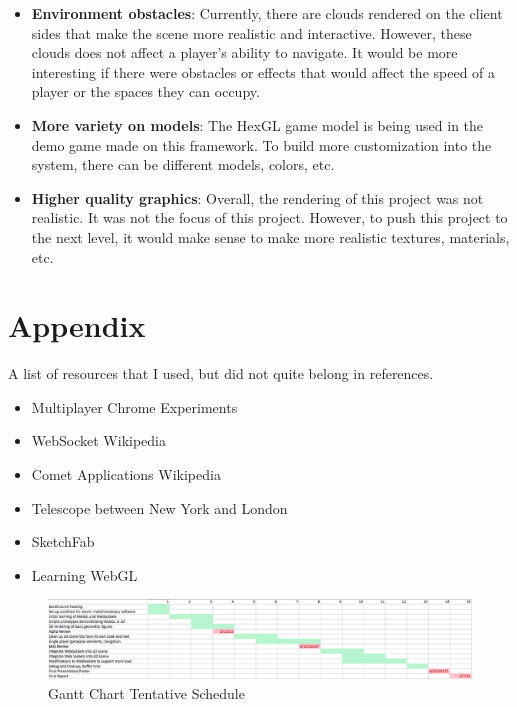 \documentclass{acmsiggraph}
\begin{document}
\begin{itemize}
    \item{\textbf{Environment obstacles}: Currently, there are clouds rendered on the client sides that make the scene more realistic and interactive. However, these clouds does not affect a player's ability to navigate. It would be more interesting if there were obstacles or effects that would affect the speed of a player or the spaces they can occupy.}
    \item{\textbf{More variety on models}: The HexGL game model is being used in the demo game made on this framework. To build more customization into the system, there can be different models, colors, etc.}
    \item{\textbf{Higher quality graphics}: Overall, the rendering of this project was not realistic. It was not the focus of this project. However, to push this project to the next level, it would make sense to make more realistic textures, materials, etc.}
\end{itemize}

\section{Appendix}
A list of resources that I used, but did not quite belong in references.
\begin{itemize}
    \item{Multiplayer Chrome Experiments}
    \item{WebSocket Wikipedia}
    \item{Comet Applications Wikipedia}
    \item{Telescope between New York and London}
    \item{SketchFab}
    \item{Learning WebGL}
\end{itemize}



\nocite{*}
\begin{figure}[ht!]
\centering
\includegraphics[width=7.5in]{chen_gianni_gantt.eps}
\caption{Gantt Chart Tentative Schedule}
\end{figure}
\end{document}
